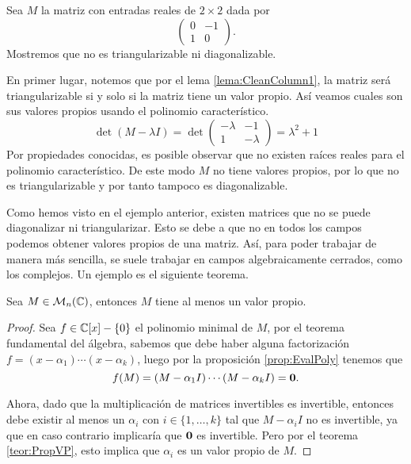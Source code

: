\begin{example}
  Sea $M$ la matriz con entradas reales de $2\times 2$ dada por 
  \[ \begin{pmatrix} 0 & -1 \\ 1 & 0 \end{pmatrix}. \]
  Mostremos que no es triangularizable ni diagonalizable.

  \examplesolution

  En primer lugar, notemos que por el lema \ref{lema:CleanColumn1}, la matriz será triangularizable si y solo si la matriz tiene un valor propio. Así veamos cuales son sus valores propios usando el polinomio característico.
    \[
      \det(M-\lambda I) = \det \begin{pmatrix} - \lambda & -1 \\ 1 & - \lambda \end{pmatrix}
        = \lambda^2  + 1
    \]
  Por propiedades conocidas, es posible observar que no existen raíces reales para el polinomio característico. De este modo $M$ no tiene valores propios, por lo que no es triangularizable y por tanto tampoco es diagonalizable.
\end{example}

Como hemos visto en el ejemplo anterior, existen matrices que no se puede diagonalizar ni triangularizar. Esto se debe a que no en todos los campos podemos obtener valores propios de una matriz. Así, para poder trabajar de manera más sencilla, se suele trabajar en campos algebraicamente cerrados, como los complejos. Un ejemplo es el siguiente teorema.

\begin{prop}\label{prop:MComplexHasEV}
  Sea $M \in  \mathcal{M}_n(\mathbb{C})$, entonces $M$ tiene al menos un valor propio.
\end{prop}
\begin{proof}
  Sea $f \in \mathbb{C}[x]-\{0\}$ el polinomio minimal de $M$, por el teorema fundamental del álgebra, sabemos que debe haber alguna factorización $f = (x-\alpha_1)\cdots(x-\alpha_k)$, luego por la proposición \ref{prop:EvalPoly} tenemos que
  \[ f(M) = (M-\alpha_1 I)\cdots(M-\alpha_k I) = \mathbf{0}.\]

  Ahora, dado que la multiplicación de matrices invertibles es invertible, entonces debe existir al menos un $\alpha_i$ con $i \in \{1,\ldots,k\}$ tal que $M-\alpha_i I$ no es invertible, ya que en caso contrario implicaría que $\mathbf{0}$ es invertible. Pero por el teorema \ref{teor:PropVP}, esto implica que $\alpha_i$ es un valor propio de $M$.
\end{proof}

